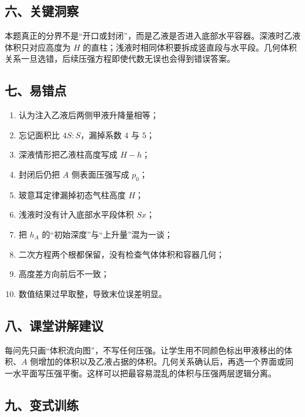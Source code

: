 \documentclass[12pt,a4paper,UTF8]{ctexart}
\newcommand{\tightlist}{\setlength{\itemsep}{0pt}\setlength{\parskip}{0pt}}
\begin{document}
\subsection{六、关键洞察}\label{ux516dux5173ux952eux6d1eux5bdf-6}

本题真正的分界不是``开口或封闭''，而是乙液是否进入底部水平容器。深液时乙液体积只对应高度为
\(H\)
的直柱；浅液时相同体积要拆成竖直段与水平段。几何体积关系一旦选错，后续压强方程即使代数无误也会得到错误答案。

\subsection{七、易错点}\label{ux4e03ux6613ux9519ux70b9-6}

\begin{enumerate}
\def\labelenumi{\arabic{enumi}.}
\tightlist
\item
  认为注入乙液后两侧甲液升降量相等；
\item
  忘记面积比 \(4S:S\)，漏掉系数 \(4\) 与 \(5\)；
\item
  深液情形把乙液柱高度写成 \(H-h\)；
\item
  封闭后仍把 \(A\) 侧表面压强写成 \(p_0\)；
\item
  玻意耳定律漏掉初态气柱高度 \(H\)；
\item
  浅液时没有计入底部水平段体积 \(Sx\)；
\item
  把 \(h_A\) 的``初始深度''与``上升量''混为一谈；
\item
  二次方程两个根都保留，没有检查气体体积和容器几何；
\item
  高度差方向前后不一致；
\item
  数值结果过早取整，导致末位误差明显。
\end{enumerate}

\subsection{八、课堂讲解建议}\label{ux516bux8bfeux5802ux8bb2ux89e3ux5efaux8bae-6}

每问先只画``体积流向图''，不写任何压强。让学生用不同颜色标出甲液移出的体积、\(A\)
侧增加的体积以及乙液占据的体积。几何关系确认后，再选一个界面或同一水平面写压强平衡。这样可以把最容易混乱的体积与压强两层逻辑分离。

\subsection{九、变式训练}\label{ux4e5dux53d8ux5f0fux8badux7ec3-6}
\end{document}
